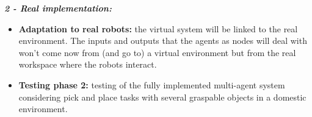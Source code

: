 \textit{\textbf{2 - Real implementation:}} 
\begin{itemize}
\item \textbf{Adaptation to real robots:} the virtual system will be linked to the real environment. The inputs and outputs that the agents as nodes will deal with won't come now from (and go to) a virtual environment but from the real workspace where the robots interact.
\item \textbf{Testing phase 2:} testing of the fully implemented multi-agent system considering pick and place tasks with several graspable objects in a domestic environment. 
\end{itemize}

